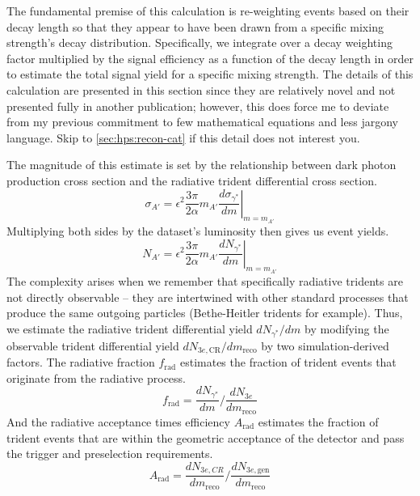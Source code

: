 The fundamental premise of this calculation is re-weighting events based on their decay length
so that they appear to have been drawn from a specific mixing strength's decay distribution.
Specifically, we integrate over a decay weighting factor multiplied by the signal efficiency
as a function of the decay length in order to estimate the total signal yield for a specific
mixing strength.
The details of this calculation are presented in this section since they are relatively novel and
not presented fully in another publication; however, this does force me to deviate from my previous
commitment to few mathematical equations and less jargony language.
Skip to \cref{sec:hps:recon-cat} if this detail does not interest you.

The magnitude of this estimate is set by the relationship between dark photon production cross section
and the radiative trident differential cross section\cite{bjorken-ap-rate:2009}.
\begin{equation}
  \sigma_{A'} = \epsilon^2\frac{3\pi}{2\alpha} m_{A'} \left.\frac{d\sigma_{\gamma^*}}{dm}\right|_{m=m_{A'}}
\end{equation}
Multiplying both sides by the dataset's luminosity then gives us event yields.
\begin{equation}
  N_{A'} = \epsilon^2\frac{3\pi}{2\alpha} m_{A'} \left.\frac{dN_{\gamma^*}}{dm}\right|_{m=m_{A'}}
\end{equation}
The complexity arises when we remember that specifically radiative tridents are not
directly observable -- they are intertwined with other standard processes that produce
the same outgoing particles (Bethe-Heitler tridents for example).
Thus, we estimate the radiative trident differential yield $dN_{\gamma^*}/dm$ by
modifying the observable trident differential yield $dN_{3e\mathrm{,CR}}/dm_\mathrm{reco}$ by
two simulation-derived factors.
The radiative fraction $f_\mathrm{rad}$ estimates the fraction of trident events
that originate from the radiative process.
\begin{equation}
  f_\mathrm{rad} = \frac{dN_{\gamma^*}}{dm} \bigg/ \frac{dN_{3e}}{dm_\mathrm{reco}}
\end{equation}
And the radiative acceptance times efficiency $A_\mathrm{rad}$ estimates the
fraction of trident events that are within the geometric acceptance of the detector
and pass the trigger and preselection requirements.
\begin{equation}
  A_\mathrm{rad} = \frac{dN_{3e,CR}}{dm_\mathrm{reco}} \bigg/ \frac{dN_{3e,\mathrm{gen}}}{dm_\mathrm{reco}}
\end{equation}
